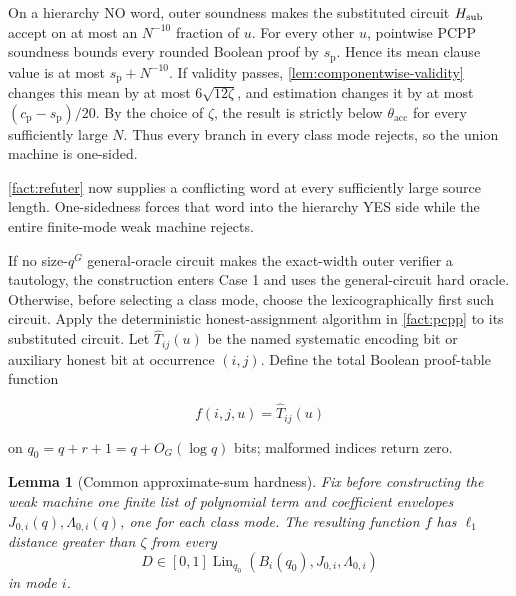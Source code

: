 \documentclass[11pt,letterpaper]{article}
\newcommand{\cref}[1]{\ref{#1}}
\newtheorem{lemma}[theorem]{Lemma}
\theoremstyle{definition}
\theoremstyle{remark}
\begin{document}
On a hierarchy NO word, outer soundness makes the substituted circuit
\(H_{\rm sub}\) accept on at most an \(N^{-10}\) fraction of \(u\). For every
other \(u\), pointwise PCPP soundness bounds every rounded Boolean proof
by \(s_{\mathrm p}\). Hence its mean clause value is at most
\(s_{\mathrm p}+N^{-10}\). If validity passes, \cref{lem:componentwise-validity} changes this
mean by at most \(6\sqrt{12\zeta}\), and estimation changes it by at
most \((c_{\mathrm p}-s_{\mathrm p})/20\). By the choice of \(\zeta\),
the result is strictly below \(\theta_{\mathrm{acc}}\) for every
sufficiently large \(N\). Thus every branch in every class mode rejects,
so the union machine is one-sided.

\cref{fact:refuter} now supplies a conflicting word at every sufficiently large
source length. One-sidedness forces that word into the hierarchy YES
side while the entire finite-mode weak machine rejects.

If no size-\(q^G\) general-oracle circuit makes the exact-width outer
verifier a tautology, the construction enters Case 1 and uses the
general-circuit hard oracle. Otherwise, before selecting a class mode,
choose the lexicographically first such circuit. Apply the deterministic
honest-assignment algorithm in \cref{fact:pcpp} to its substituted circuit.
Let \(\widehat T_{ij}(u)\) be the named systematic encoding bit or
auxiliary honest bit at occurrence \((i,j)\). Define the total Boolean
proof-table function

\[
f(i,j,u)=\widehat T_{ij}(u)
\]

on \(q_0=q+r+1=q+O_G(\log q)\) bits; malformed indices return zero.

\begin{lemma}[Common approximate-sum hardness]
\label{lem:common-sum-hardness}
Fix before
constructing the weak machine one finite list of polynomial term and
coefficient envelopes \(J_{0,i}(q),\Lambda_{0,i}(q)\), one for each
class mode. The resulting function \(f\) has \(\ell_1\) distance greater
than \(\zeta\) from every \[
D\in[0,1]\operatorname{Lin}_{q_0}(B_i(q_0),J_{0,i},\Lambda_{0,i})
\] in mode \(i\).
\end{lemma}
\end{document}
